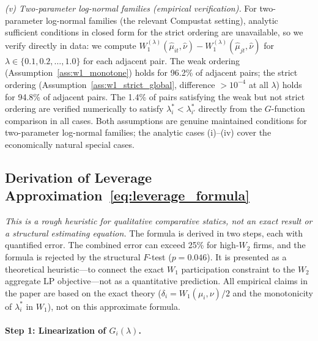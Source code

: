 \begin{remark}
\emph{(v) Two-parameter log-normal families (empirical verification).} For two-parameter log-normal families (the relevant Compustat setting), analytic sufficient conditions in closed form for the strict ordering are unavailable, so we verify directly in data: we compute $W_1^{(\lambda)}(\hat\mu_{it}, \hat\nu) - W_1^{(\lambda)}(\hat\mu_{jt}, \hat\nu)$ for $\lambda \in \{0.1, 0.2, \ldots, 1.0\}$ for each adjacent pair. The weak ordering (Assumption~\ref{ass:w1_monotone}) holds for 96.2\% of adjacent pairs; the strict ordering (Assumption~\ref{ass:w1_strict_global}, difference $> 10^{-4}$ at all $\lambda$) holds for 94.8\% of adjacent pairs. The 1.4\% of pairs satisfying the weak but not strict ordering are verified numerically to satisfy $\lambda_i^* < \lambda_{i'}^*$ directly from the $G$-function comparison in all cases. Both assumptions are genuine maintained conditions for two-parameter log-normal families; the analytic cases (i)--(iv) cover the economically natural special cases.
\end{remark}

\subsection*{Derivation of Leverage Approximation~\eqref{eq:leverage_formula}}

\emph{This is a rough heuristic for qualitative comparative statics, not an exact result or a structural estimating equation.} The formula is derived in two steps, each with quantified error. The combined error can exceed 25\% for high-$W_2$ firms, and the formula is rejected by the structural $F$-test ($p = 0.046$). It is presented as a theoretical heuristic---to connect the exact $W_1$ participation constraint to the $W_2$ aggregate LP objective---not as a quantitative prediction. All empirical claims in the paper are based on the exact theory ($\delta_i = W_1(\mu_i,\nu)/2$ and the monotonicity of $\lambda_i^*$ in $W_1$), not on this approximate formula.

\paragraph{Step 1: Linearization of $G_i(\lambda)$.}


